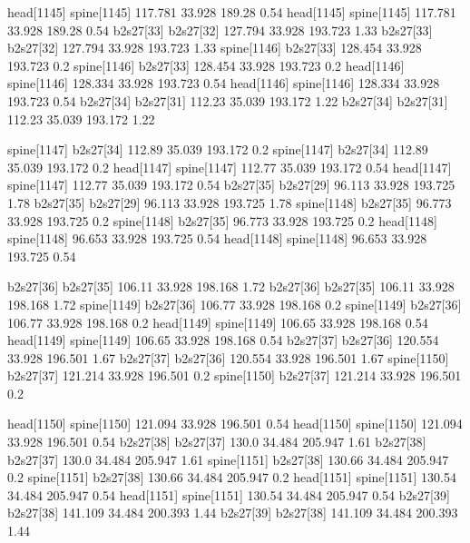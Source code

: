head[1145]    spine[1145]    117.781    33.928    189.28    0.54
head[1145]    spine[1145]    117.781    33.928    189.28    0.54
b2s27[33]    b2s27[32]    127.794    33.928    193.723    1.33
b2s27[33]    b2s27[32]    127.794    33.928    193.723    1.33
spine[1146]    b2s27[33]    128.454    33.928    193.723    0.2
spine[1146]    b2s27[33]    128.454    33.928    193.723    0.2
head[1146]    spine[1146]    128.334    33.928    193.723    0.54
head[1146]    spine[1146]    128.334    33.928    193.723    0.54
b2s27[34]    b2s27[31]    112.23    35.039    193.172    1.22
b2s27[34]    b2s27[31]    112.23    35.039    193.172    1.22


spine[1147]    b2s27[34]    112.89    35.039    193.172    0.2
spine[1147]    b2s27[34]    112.89    35.039    193.172    0.2
head[1147]    spine[1147]    112.77    35.039    193.172    0.54
head[1147]    spine[1147]    112.77    35.039    193.172    0.54
b2s27[35]    b2s27[29]    96.113    33.928    193.725    1.78
b2s27[35]    b2s27[29]    96.113    33.928    193.725    1.78
spine[1148]    b2s27[35]    96.773    33.928    193.725    0.2
spine[1148]    b2s27[35]    96.773    33.928    193.725    0.2
head[1148]    spine[1148]    96.653    33.928    193.725    0.54
head[1148]    spine[1148]    96.653    33.928    193.725    0.54


b2s27[36]    b2s27[35]    106.11    33.928    198.168    1.72
b2s27[36]    b2s27[35]    106.11    33.928    198.168    1.72
spine[1149]    b2s27[36]    106.77    33.928    198.168    0.2
spine[1149]    b2s27[36]    106.77    33.928    198.168    0.2
head[1149]    spine[1149]    106.65    33.928    198.168    0.54
head[1149]    spine[1149]    106.65    33.928    198.168    0.54
b2s27[37]    b2s27[36]    120.554    33.928    196.501    1.67
b2s27[37]    b2s27[36]    120.554    33.928    196.501    1.67
spine[1150]    b2s27[37]    121.214    33.928    196.501    0.2
spine[1150]    b2s27[37]    121.214    33.928    196.501    0.2


head[1150]    spine[1150]    121.094    33.928    196.501    0.54
head[1150]    spine[1150]    121.094    33.928    196.501    0.54
b2s27[38]    b2s27[37]    130.0    34.484    205.947    1.61
b2s27[38]    b2s27[37]    130.0    34.484    205.947    1.61
spine[1151]    b2s27[38]    130.66    34.484    205.947    0.2
spine[1151]    b2s27[38]    130.66    34.484    205.947    0.2
head[1151]    spine[1151]    130.54    34.484    205.947    0.54
head[1151]    spine[1151]    130.54    34.484    205.947    0.54
b2s27[39]    b2s27[38]    141.109    34.484    200.393    1.44
b2s27[39]    b2s27[38]    141.109    34.484    200.393    1.44


